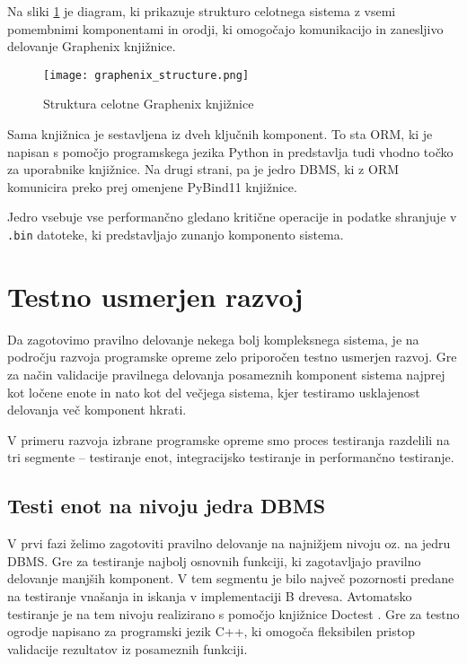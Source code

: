 \documentclass[a4paper,12pt,openright]{book}
\begin{document}
    Na sliki \ref{graphenix_structure} je diagram, ki prikazuje strukturo celotnega sistema z vsemi pomembnimi komponentami in orodji, ki omogočajo komunikacijo in zanesljivo delovanje Graphenix knjižnice.
    
    \begin{figure}[H]
            \centerline{\texttt{[image: graphenix\_structure.png]}}
            \caption{Struktura celotne Graphenix knjižnice}
        \label{graphenix_structure}
    \end{figure}

    \noindent
    Sama knjižnica je sestavljena iz dveh ključnih komponent. To sta ORM, ki je napisan s pomočjo programskega jezika Python in predstavlja tudi vhodno točko za uporabnike knjižnice. Na drugi strani, pa je jedro DBMS, ki z ORM komunicira preko prej omenjene PyBind11 \cite{PYBIND11_GITHUB} knjižnice.

    Jedro vsebuje vse performančno gledano kritične operacije in podatke shranjuje v {\tt .bin} datoteke, ki predstavljajo zunanjo komponento sistema.
    
    \section{Testno usmerjen razvoj}

    Da zagotovimo pravilno delovanje nekega bolj kompleksnega sistema, je na področju razvoja programske opreme zelo priporočen testno usmerjen razvoj. Gre za način validacije pravilnega delovanja posameznih komponent sistema najprej kot ločene enote in nato kot del večjega sistema, kjer testiramo usklajenost delovanja več komponent hkrati.
    
    V primeru razvoja izbrane programske opreme smo proces testiranja razdelili na tri segmente – testiranje enot, integracijsko testiranje in performančno testiranje.
   
   \subsection{Testi enot na nivoju jedra DBMS}

    V prvi fazi želimo zagotoviti pravilno delovanje na najnižjem nivoju oz. na jedru DBMS. Gre za testiranje najbolj osnovnih funkciji, ki zagotavljajo pravilno delovanje manjših komponent. V tem segmentu je bilo največ pozornosti predane na testiranje vnašanja in iskanja v implementaciji B drevesa. Avtomatsko testiranje je na tem nivoju realizirano s pomočjo knjižnice Doctest \cite{DOCTEST_GITHUB}. Gre za testno ogrodje napisano za programski jezik C++, ki omogoča fleksibilen pristop validacije rezultatov iz posameznih funkciji.
   
\end{document}
